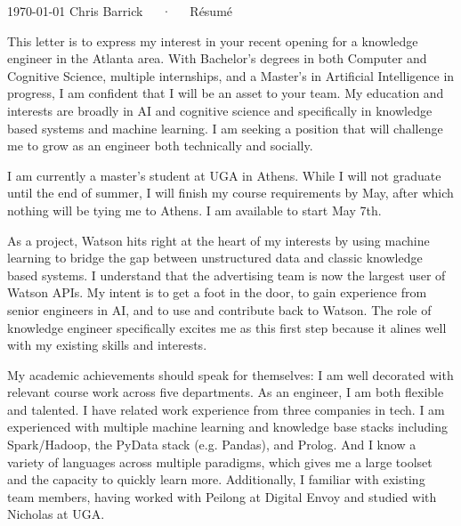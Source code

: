 \documentclass[11pt, letterpaper]{awesome-cv}
\begin{document}
\makecvheader[C]

\makecvfooter
  {\today}
  {Chris Barrick~~~·~~~Résumé}
  {\thepage}

\makelettertitle

\begin{cvletter}

This letter is to express my interest in your recent opening for a knowledge engineer in the Atlanta area. With Bachelor's degrees in both Computer and Cognitive Science, multiple internships, and a Master's in Artificial Intelligence in progress, I am confident that I will be an asset to your team. My education and interests are broadly in AI and cognitive science and specifically in knowledge based systems and machine learning. I am seeking a position that will challenge me to grow as an engineer both technically and socially.

I am currently a master's student at UGA in Athens. While I will not graduate until the end of summer, I will finish my course requirements by May, after which nothing will be tying me to Athens. I am available to start May 7th.

As a project, Watson hits right at the heart of my interests by using machine learning to bridge the gap between unstructured data and classic knowledge based systems. I understand that the advertising team is now the largest user of Watson APIs. My intent is to get a foot in the door, to gain experience from senior engineers in AI, and to use and contribute back to Watson. The role of knowledge engineer specifically excites me as this first step because it alines well with my existing skills and interests.

My academic achievements should speak for themselves: I am well decorated with relevant course work across five departments. As an engineer, I am both flexible and talented. I have related work experience from three companies in tech. I am experienced with multiple machine learning and knowledge base stacks including Spark/Hadoop, the PyData stack (e.g. Pandas), and Prolog. And I know a variety of languages across multiple paradigms, which gives me a large toolset and the capacity to quickly learn more. Additionally, I familiar with existing team members, having worked with Peilong at Digital Envoy and studied with Nicholas at UGA.

\end{cvletter}


\makeletterclosing
\end{document}
